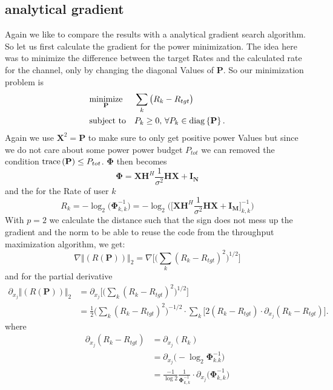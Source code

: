 \subsection{analytical gradient}
Again we like to compare the results with a analytical gradient search algorithm. So let us first calculate the gradient for the power minimization.
The idea here was to minimize the difference between the target Rates and the calculated rate for the channel, only by changing the diagonal Values of $\mathbf{P}$.
So our minimization problem is
\begin{equation}
	\begin{aligned}
		& \underset{\mathbf{P}}{\text{minimize}}
		& & \sum_k{\bigr(R_k-R_{tgt}\bigl)} \\
		& \text{subject to}
		& & P_k\geq 0,\,\forall P_k\in \mathrm{diag}\left\lbrace\mathbf{P}\right\rbrace.
	\end{aligned}
\end{equation}
Again we use $\mathbf{X}^2 = \mathbf{P}$ to make sure to only get positive power Values but since we do not care about some power power budget $P_{tot}$ we can removed the condition $\text{trace}\left(\mathbf{P}\right)\leq P_{tot}$. $\mathbf{\Phi}$ then becomes
\begin{equation}
	\mathbf{\Phi} = \mathbf{X}\mathbf{H}^H\frac{1}{\sigma^2}\mathbf{H} \mathbf{X} + \mathbf{I_N}
\end{equation}
and the for the Rate of user $k$
\begin{equation}
	R_k = -\log_2\Biggr(\mathbf{\Phi}_{k,k}^{-1}\Biggl) = -\log_2\Biggr(\biggr[\mathbf{X}\mathbf{H}^H\frac{1}{\sigma^2}\mathbf{H} \mathbf{X} + \mathbf{I_M} \biggl]_{k,k}^{-1}\Biggl)
\end{equation}
With $p=2$ we calculate the distance such that the sign does not mess up the gradient and the norm to be able to reuse the code from the throughput maximization algorithm, we get:
\begin{equation}
	\nabla \bigr\Vert{(R(\mathbf{P}))\bigl\Vert}_2 = \nabla \Biggr[ \Biggr(\sum_k{(R_k-R_{tgt})^2}\Biggl)^{1/2} \Biggl]
\end{equation}
and for the partial derivative
\begin{align}
	\partial_{x_j} \bigr\Vert{(R(\mathbf{P}))\bigl\Vert}_2
	&=\partial_{x_j}\Biggr[\Biggr(\sum_k{(R_k-R_{tgt})^2}\Biggl)^{1/2}\Biggl]\\
	&=\frac{1}{2}\Biggr(\sum_k{(R_k-R_{tgt})^2}\Biggl)^{-1/2} \cdot \sum_k{\Biggr[2(R_k-R_{tgt}) \cdot \partial_{x_j}(R_k-R_{tgt})\Biggl]}.
\end{align}
where
\begin{align}
	\partial_{x_j}(R_k-R_{tgt}) &= \partial_{x_j}(R_k)\\
	&= \partial_{x_j}\bigr(-\log_2{\mathbf{\Phi}_{k.k}^{-1}}\bigl)\\
	&=\frac{-1}{\log{2}}\frac{1}{\mathbf{\Phi}_{k,k}^{-1}} \cdot \partial_{x_j}\bigr(\mathbf{\Phi}_{k,k}^{-1}\bigl)
\end{align}
